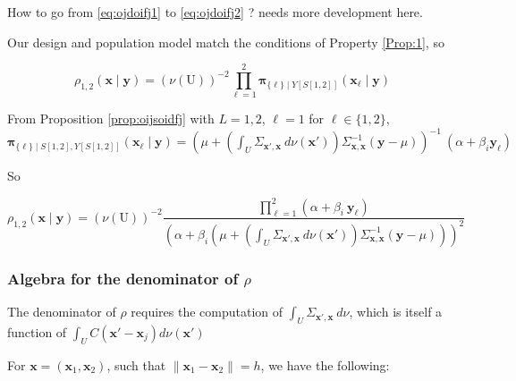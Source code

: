 \documentclass[12pt]{article}
\theoremstyle{definition}
\theoremstyle{remark}
\newcommand{\dominantU}{\nu}
\newcommand{\sampledensity}{\mathbf{\pi}}
\newcommand{\Covariogram}{C}
\newcommand{\Sample}{S}
\newcommand{\Pop}{\mathrm{U}}
\newcommand{\position}{\mathbf{x}}
\newcommand{\Sampleindex}{L}
\newcommand{\Signal}{Y}
\newcommand{\signal}{\mathbf{y}}
\begin{document}
{\color{red}How to go from 
\eqref{eq:ojdoifj1}
to \eqref{eq:ojdoifj2} ? needs more development here.}

Our design and population model match the conditions of 
Property \ref{Prop:1}, so

    $$\rho_{1,2}(\position\mid\signal)=
     (\dominantU(\Pop))^{-2}\prod_{\ell=1}^2 \sampledensity_{\{\ell\}\mid\Signal[\Sample[1,2]]}(\position_\ell\mid \signal)
         $$
         
         From Proposition \ref{prop:oijsoidfj} with $\Sampleindex=1,2$, $\ell= 1$
         for $\ell\in\{1,2\}$,  
         $\sampledensity_{\{\ell\}\mid\Sample[1,2],\Signal[\Sample[1,2]]}(\position_\ell\mid \signal)=
         \left(\mu+\left(\int_{U}\Sigma_{\position',\position}~d\dominantU\left(\position'\right)\right)\Sigma_{\position,\position}^{-1} (\signal-\mu)\right)^{-1}~
    (\alpha+\beta_i\signal_\ell)$

So 

$$\rho_{1,2}(\position\mid\signal)=(\dominantU(\Pop))^{-2}\frac{\prod_{\ell=1}^2(\alpha+\beta_i~\signal_\ell)}{
\left(\alpha+\beta_i(\mu+\left(\int_{U}\Sigma_{\position',\position}~d\dominantU\left(\position'\right)\right)\Sigma_{\position,\position}^{-1} (\signal-\mu))\right)^{2}
}$$


\subsubsection{Algebra for the denominator of $\rho$}

The denominator of $\rho$ requires the computation of $\int_{U}\Sigma_{\position',\position}~d\dominantU$, which is itself a function of
$\int_{U}\Covariogram(\position'-\position_j)d\dominantU\left(\position'\right)$


For $\position=(\position_1,\position_2)$, such that $\|\position_1-\position_2\|=h$, we have the following:
\end{document}
